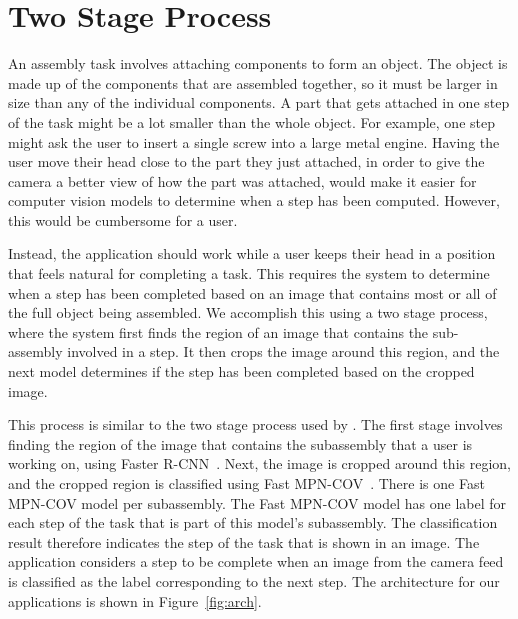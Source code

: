 \section{Two Stage Process}\label{sec:two_stage}

An assembly task involves attaching components to form an object.
The object is made up of the components that are assembled together, so it must
be larger in size than any of the individual components.
A part that gets attached in one step of the task might be a lot smaller than
the whole object.
For example, one step might ask the user to insert a single screw into a large
metal engine.
Having the user move their head close to the part they just attached, in order
to give the camera a better view of how the part was attached, would make it
easier for computer vision models to determine when a step has been computed.
However, this would be cumbersome for a user.

Instead, the application should work while a user keeps their head in a position
that feels natural for completing a task.
This requires the system to determine when a step has been
completed based on an image that contains most or all of the full object being
assembled.
We accomplish this using a two stage process, where the system first finds the
region of an image that contains the sub-assembly involved in a step.
It then
crops the image around this region, and the next model determines if the step
has been completed based on the cropped image.

This process is similar to the two stage process used by
\citet{gebru2017finegrained}.
The first stage involves finding the region of the
image that contains the subassembly that a user is working on, using Faster
R-CNN~\cite{frcnn}.
Next, the image is cropped around this region, and the cropped region is
classified using Fast MPN-COV~\cite{Li_2018_CVPR}.
There is one Fast MPN-COV model per subassembly.
The Fast MPN-COV model has one label for each step of the task that is part of
this model's subassembly.
The classification result therefore indicates the step of the task that is shown
in an image.
The application considers a step to be complete when an image from the camera
feed is classified as the label corresponding to the next step.
The architecture for our applications is shown in Figure~\ref{fig:arch}.

